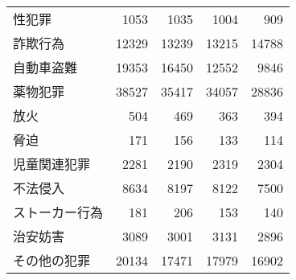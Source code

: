 \begin{table}[t]
\begin{tabular}{lrrrr}
  性犯罪 & 1053 & 1035 & 1004 & 909 \\
  詐欺行為 & 12329 & 13239 & 13215 & 14788 \\
  自動車盗難 & 19353 & 16450 & 12552 & 9846 \\
  薬物犯罪 & 38527 & 35417 & 34057 & 28836 \\
  放火 & 504 & 469 & 363 & 394 \\
  脅迫 & 171 & 156 & 133 & 114 \\
  児童関連犯罪 & 2281 & 2190 & 2319 & 2304 \\
  不法侵入 & 8634 & 8197 & 8122 & 7500 \\
  ストーカー行為 & 181 & 206 & 153 & 140 \\
  治安妨害 & 3089 & 3001 & 3131 & 2896 \\
  その他の犯罪 & 20134 & 17471 & 17979 & 16902 \\
  \bottomrule
  \end{tabular}
  \end{table}